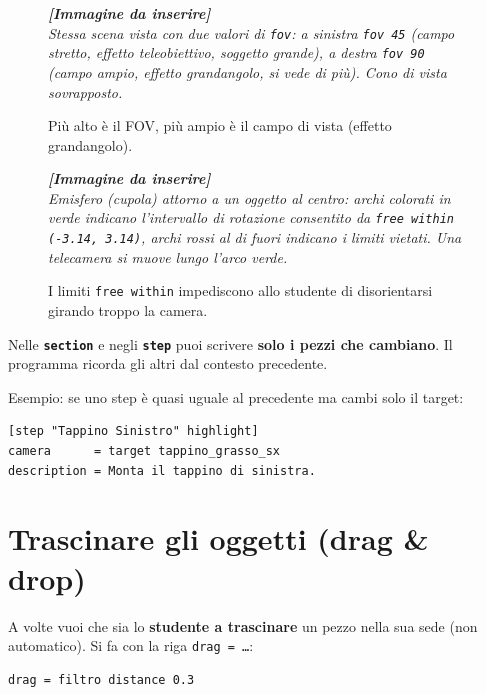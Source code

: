 ﻿\documentclass[a4paper,12pt,oneside]{book}
\newcommand{\kw}[1]{\texttt{\color{keycolor}#1}}
\newcommand{\sez}[1]{\texttt{\color{sectioncolor}\textbf{#1}}}
\newcommand{\imgph}[2]{%
  \begin{tcolorbox}[colback=cvtlightblue!30,colframe=cvtblue!40,%
    width=#1,halign=center,valign=center,height=5cm,boxrule=0.5pt,arc=3pt]%
    \textcolor{cvtgray}{\itshape\footnotesize\textbf{[Immagine da inserire]}\\[3pt]#2}%
  \end{tcolorbox}}
\begin{document}
\begin{figure}[H]
  \centering
  \imgph{12cm}{Stessa scena vista con due valori di \texttt{fov}: a sinistra \texttt{fov 45} (campo stretto, effetto teleobiettivo, soggetto grande), a destra \texttt{fov 90} (campo ampio, effetto grandangolo, si vede di più). Cono di vista sovrapposto.}
  \caption{Più alto è il FOV, più ampio è il campo di vista (effetto grandangolo).}
  \label{fig:fov-confronto}
\end{figure}

\begin{figure}[H]
  \centering
  \imgph{10cm}{Emisfero (cupola) attorno a un oggetto al centro: archi colorati in verde indicano l'intervallo di rotazione consentito da \texttt{free within (-3.14, 3.14)}, archi rossi al di fuori indicano i limiti vietati. Una telecamera si muove lungo l'arco verde.}
  \caption{I limiti \texttt{free within} impediscono allo studente di disorientarsi girando troppo la camera.}
  \label{fig:free-within}
\end{figure}

\begin{trucchetto}
Nelle \sez{section} e negli \sez{step} puoi scrivere \textbf{solo i pezzi che
cambiano}. Il programma ricorda gli altri dal contesto precedente.

Esempio: se uno step è quasi uguale al precedente ma cambi solo il target:

\begin{lstlisting}
[step "Tappino Sinistro" highlight]
camera      = target tappino_grasso_sx
description = Monta il tappino di sinistra.
\end{lstlisting}
\end{trucchetto}

\chapter{Trascinare gli oggetti (drag \& drop)}
\label{ch:drag}

A volte vuoi che sia lo \textbf{studente a trascinare} un pezzo nella sua sede
(non automatico). Si fa con la riga \kw{drag = \ldots}:

\begin{lstlisting}
drag = filtro distance 0.3
\end{lstlisting}
\end{document}
